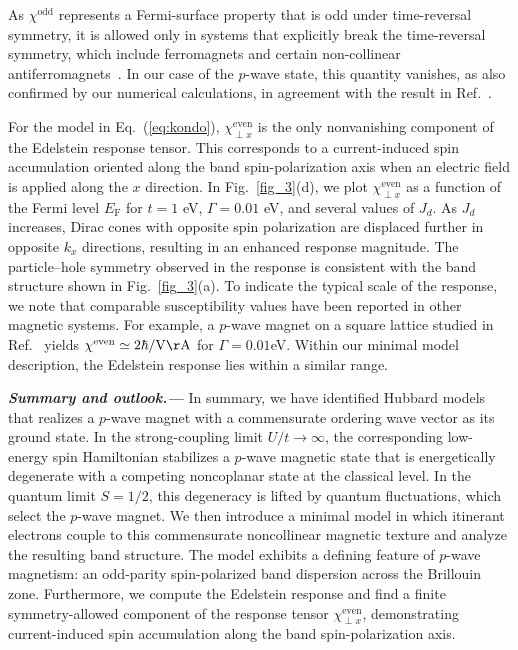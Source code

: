 \documentclass[aps,prl,twocolumn,showpacs,superscriptaddress]{revtex4-2}
\begin{document}
As $\chi^{\mathrm{odd}}$ represents a Fermi-surface property that is odd under time-reversal symmetry, it is allowed only in systems that explicitly break the time-reversal symmetry, which include ferromagnets and certain non-collinear antiferromagnets~\cite{vzelezny2017spin,manchon2019current,gurung2021transport,gonzalez2024non}. In our case of the $p$-wave state, this quantity vanishes, as also confirmed by our numerical calculations, in agreement with the result in Ref.~.

For the model in Eq.~(\ref{eq:kondo}), $\chi^{\text{even}}_{\perp x}$ is the only nonvanishing component of the Edelstein response tensor. This corresponds to a current-induced spin accumulation oriented along the band spin-polarization axis when an electric field is applied along the $x$ direction. In Fig.~\ref{fig_3}(d), we plot $\chi^{\text{even}}_{\perp x}$ as a function of the Fermi level $E_{\text{F}}$ for $t = 1$ eV, $\Gamma = 0.01$ eV, and several values of $J_d$. As $J_d$ increases, Dirac cones with opposite spin polarization are displaced further in opposite $k_x$ directions, resulting in an enhanced response magnitude. The particle–hole symmetry observed in the response is consistent with the band structure shown in Fig.~\ref{fig_3}(a). To indicate the typical scale of the response, we note that comparable susceptibility values have been reported in other magnetic systems. For example, a $p$-wave magnet on a square lattice studied in Ref.~ yields $\chi^{\text{even}} \simeq 2\hbar/\mathrm{V\AA}$ for $\Gamma = 0.01$eV. Within our minimal model description, the Edelstein response lies within a similar range.

\textbf{\textit{Summary and outlook.---}} In summary, we have identified Hubbard models that realizes a $p$-wave magnet with a commensurate ordering wave vector as its ground state. In the strong-coupling limit $U/t \to \infty$, the corresponding low-energy spin Hamiltonian stabilizes a $p$-wave magnetic state that is energetically degenerate with a competing noncoplanar state at the classical level. In the quantum limit $S = 1/2$, this degeneracy is lifted by quantum fluctuations, which select the $p$-wave magnet. We then introduce a minimal model in which itinerant electrons couple to this commensurate noncollinear magnetic texture and analyze the resulting band structure. The model exhibits a defining feature of $p$-wave magnetism: an odd-parity spin-polarized band dispersion across the Brillouin zone. Furthermore, we compute the Edelstein response and find a finite symmetry-allowed component of the response tensor $\chi^{\text{even}}_{\perp x}$, demonstrating current-induced spin accumulation along the band spin-polarization axis.
\end{document}
